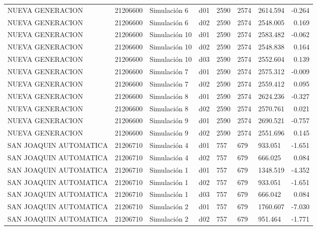 \begin{landscape}
\begin{longtable}{lrlp{2cm}p{2cm}p{3cm}p{2cm}r}
        NUEVA GENERACION &  21206600 &   Simulación 6 &   d01 &      2590 &     2574 &  2614.594 &    -0.264 \\
        NUEVA GENERACION &  21206600 &   Simulación 6 &   d02 &      2590 &     2574 &  2548.005 &     0.169 \\
        NUEVA GENERACION &  21206600 &  Simulación 10 &   d01 &      2590 &     2574 &  2583.482 &    -0.062 \\
        NUEVA GENERACION &  21206600 &  Simulación 10 &   d02 &      2590 &     2574 &  2548.838 &     0.164 \\
        NUEVA GENERACION &  21206600 &  Simulación 10 &   d03 &      2590 &     2574 &  2552.604 &     0.139 \\
        NUEVA GENERACION &  21206600 &   Simulación 7 &   d01 &      2590 &     2574 &  2575.312 &    -0.009 \\
        NUEVA GENERACION &  21206600 &   Simulación 7 &   d02 &      2590 &     2574 &  2559.412 &     0.095 \\
        NUEVA GENERACION &  21206600 &   Simulación 8 &   d01 &      2590 &     2574 &  2624.236 &    -0.327 \\
        NUEVA GENERACION &  21206600 &   Simulación 8 &   d02 &      2590 &     2574 &  2570.761 &     0.021 \\
        NUEVA GENERACION &  21206600 &   Simulación 9 &   d01 &      2590 &     2574 &  2690.521 &    -0.757 \\
        NUEVA GENERACION &  21206600 &   Simulación 9 &   d02 &      2590 &     2574 &  2551.696 &     0.145 \\
  SAN JOAQUIN AUTOMATICA &  21206710 &   Simulación 4 &   d01 &       757 &      679 &   933.051 &    -1.651 \\
  SAN JOAQUIN AUTOMATICA &  21206710 &   Simulación 4 &   d02 &       757 &      679 &   666.025 &     0.084 \\
  SAN JOAQUIN AUTOMATICA &  21206710 &   Simulación 1 &   d01 &       757 &      679 &  1348.519 &    -4.352 \\
  SAN JOAQUIN AUTOMATICA &  21206710 &   Simulación 1 &   d02 &       757 &      679 &   933.051 &    -1.651 \\
  SAN JOAQUIN AUTOMATICA &  21206710 &   Simulación 1 &   d03 &       757 &      679 &   666.042 &     0.084 \\
  SAN JOAQUIN AUTOMATICA &  21206710 &   Simulación 2 &   d01 &       757 &      679 &  1760.607 &    -7.030 \\
  SAN JOAQUIN AUTOMATICA &  21206710 &   Simulación 2 &   d02 &       757 &      679 &   951.464 &    -1.771 \\

\end{longtable}
\end{landscape}
